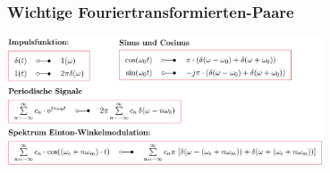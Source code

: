 

	
		\subsubsection{Wichtige Fouriertransformierten-Paare}
			\includegraphics[width=0.7\textwidth]{./bilder/fourierTransPaare.png}\\		